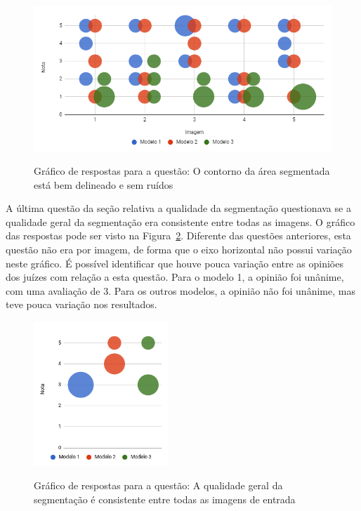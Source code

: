 \documentclass[12pt,oneside,a4paper,english,french,spanish,brazil,]{abntex2}
\begin{document}
\begin{figure}[ht]
\centering
\caption{Gráfico de respostas para a questão: O contorno da área segmentada está bem delineado e sem ruídos}
\includegraphics[width=1.0\textwidth]{imagens/Avaliacao_Juizes/Qualidade_2.PNG}
\sourceAuthor{}
\label{fig:AJ_Qualidade_2}
\end{figure}

A última questão da seção relativa a qualidade da segmentação questionava se a qualidade geral da segmentação era consistente entre todas as imagens. O gráfico das respostas pode ser visto na Figura~\ref{fig:AJ_Qualidade_7}. Diferente das questões anteriores, esta questão não era por imagem, de forma que o eixo horizontal não possui variação neste gráfico. É possível identificar que houve pouca variação entre as opiniões dos juízes com relação a esta questão. Para o modelo 1, a opinião foi unânime, com uma avaliação de 3. Para os outros modelos, a opinião não foi unânime, mas teve pouca variação nos resultados.

\begin{figure}[ht]
\centering
\caption{Gráfico de respostas para a questão: A qualidade geral da segmentação é consistente entre todas as imagens de entrada}
\includegraphics[width=0.45\textwidth]{imagens/Avaliacao_Juizes/Grafico_7.png}
\sourceAuthor{}
\label{fig:AJ_Qualidade_7}
\end{figure}
\end{document}
